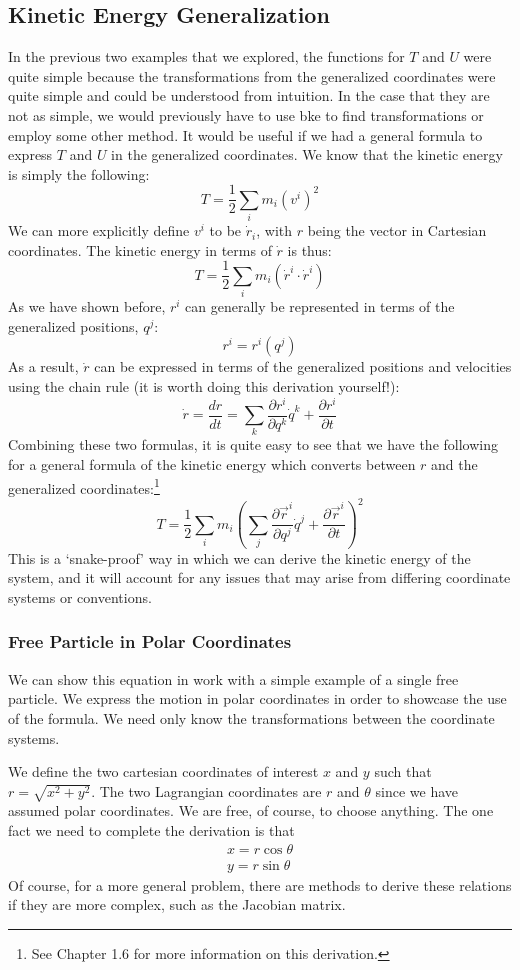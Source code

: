 \subsection{Kinetic Energy Generalization}
In the previous two examples that we explored, the functions for $T$ and $U$ were quite simple because the transformations from the generalized coordinates were quite simple and could be understood from intuition. In the case that they are not as simple, we would previously have to use \gls{bke} to find transformations or employ some other method. It would be useful if we had a general formula to express $T$ and $U$ in the generalized coordinates. We know that the kinetic energy is simply the following:
$$T=\frac{1}{2}\sum_im_i({v^i})^2$$
We can more explicitly define $v^i$ to be $\dot{r}_i$, with $r$ being the vector in Cartesian coordinates. The kinetic energy in terms of $\dot{r}$ is thus:
$$T=\frac{1}{2}\sum_im_i(\dot{r}^i\cdot\dot{r}^i)$$
As we have shown before, $r^i$ can generally be represented in terms of the generalized positions, $q^j$:
$$r^i=r^i(q^j)$$
As a result, $\dot{r}$ can be expressed in terms of the generalized positions and velocities using the chain rule (it is worth doing this derivation yourself!):
$$\dot{r}=\frac{dr}{dt}=\sum_k{\frac{\partial r^i}{\partial q^k}\dot{q}^k+\frac{\partial r^i}{\partial t}}$$
Combining these two formulas, it is quite easy to see that we have the following for a general formula of the kinetic energy which converts between $r$ and the generalized coordinates:\footnote{See \cite{goldstein_classical_2008} Chapter 1.6 for more information on this derivation.}
$$T=\frac{1}{2}\sum_im_i\left(\sum_j\frac{\partial\vec{r}^i}{\partial q^j}\dot{q}^j+\frac{\partial \vec{r}^i}{\partial t}\right)^2$$
This is a `snake-proof' way in which we can derive the kinetic energy of the system, and it will account for any issues that may arise from differing coordinate systems or conventions.

\subsubsection{Free Particle in Polar Coordinates}
We can show this equation in work with a simple example of a single free particle. We express the motion in polar coordinates in order to showcase the use of the formula. We need only know the transformations between the coordinate systems.

We define the two cartesian coordinates of interest $x$ and $y$ such that $r=\sqrt{x^2+y^2}$. The two \gls{Lagrangian} coordinates are $r$ and $\theta$ since we have assumed polar coordinates. We are free, of course, to choose anything. The one fact we need to complete the derivation is that 
\begin{gather}
    x=r\cos\theta\\
    y=r\sin\theta
\end{gather}
Of course, for a more general problem, there are methods to derive these relations if they are more complex, such as the Jacobian matrix.

